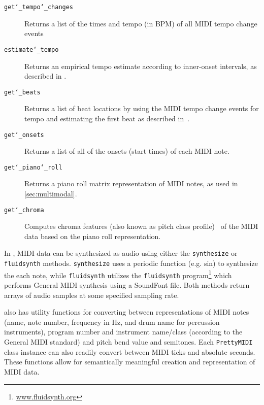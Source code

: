 \begin{description}
  \item[\texttt{get\char`_tempo\char`_changes}] Returns a list of the times and tempo (in BPM) of all MIDI tempo change events
  \item[\texttt{estimate\char`_tempo}] Returns an empirical tempo estimate according to inner-onset intervals, as described in \cite{dixon2001automatic}.
  \item[\texttt{get\char`_beats}] Returns a list of beat locations by using the MIDI tempo change events for tempo and estimating the first beat as described in~\cite{dixon2001automatic}.
  \item[\texttt{get\char`_onsets}] Returns a list of all of the onsets (start times) of each MIDI note.
  \item[\texttt{get\char`_piano\char`_roll}] Returns a piano roll matrix representation of MIDI notes, as used in \cref{sec:multimodal}.
  \item[\texttt{get\char`_chroma}] Computes chroma features (also known as pitch class profile)~\cite{fujishima1999realtime} of the MIDI data based on the piano roll representation.
\end{description}

In \prettymidi{}, MIDI data can be synthesized as audio using either the \texttt{synthesize} or \texttt{fluidsynth} methods.
\texttt{synthesize} uses a periodic function (e.g. sin) to synthesize the each note, while \texttt{fluidsynth} utilizes the \texttt{fluidsynth} program\footnote{\url{www.fluidsynth.org}} which performs General MIDI synthesis using a SoundFont file.
Both methods return arrays of audio samples at some specified sampling rate.

\prettymidi{} also has utility functions for converting between representations of MIDI notes (name, note number, frequency in Hz, and drum name for percussion instruments), program number and instrument name/class (according to the General MIDI standard) and pitch bend value and semitones.
Each \texttt{PrettyMIDI} class instance can also readily convert between MIDI ticks and absolute seconds.
These functions allow for semantically meaningful creation and representation of MIDI data.
